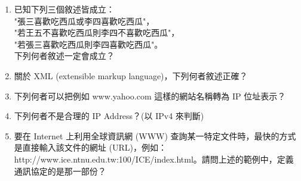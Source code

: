 \documentclass[12pt,a4paper]{report}
\begin{document}
\begin{CJK}{UTF8}{bkai}
\begin{enumerate}
\item 已知下列三個敘述皆成立：\\
"張三喜歡吃西瓜或李四喜歡吃西瓜"，\\
"若王五不喜歡吃西瓜則李四不喜歡吃西瓜"，\\
"若張三喜歡吃西瓜則李四喜歡吃西瓜"。\\
下列何者敘述一定會成立？
\item 關於 XML (extensible markup language)，下列何者敘述正確？
\item 下列何者可以把例如 www.yahoo.com 這樣的網站名稱轉為 IP 位址表示？
\item 下列何者不是合理的 IP Address？(以 IPv4 來判斷)
\item 要在 Internet 上利用全球資訊網 (WWW) 查詢某一特定文件時，最快的方式是直接輸入該文件的網址 (URL)，例如：http://www.ice.ntnu.edu.tw:100/ICE/index.html。請問上述的範例中，定義通訊協定的是那一部份？

\end{enumerate}
\end{CJK}
\end{document}
